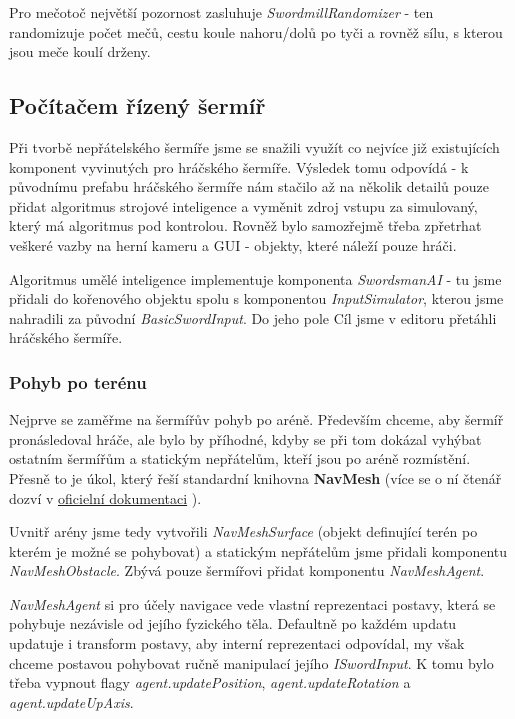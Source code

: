 Pro mečotoč největší pozornost zasluhuje \textit{SwordmillRandomizer} - ten randomizuje počet mečů, cestu koule nahoru/dolů po tyči a rovněž sílu, s kterou jsou meče koulí drženy.


\subsection{Počítačem řízený šermíř} \label{knightEnemySubsection}

Při tvorbě nepřátelského šermíře jsme se snažili využít co nejvíce již existujících komponent vyvinutých pro hráčského šermíře. Výsledek tomu odpovídá - k původnímu prefabu hráčského šermíře nám stačilo až na několik detailů pouze přidat algoritmus strojové inteligence a vyměnit zdroj vstupu za simulovaný, který má algoritmus pod kontrolou. Rovněž bylo samozřejmě třeba zpřetrhat veškeré vazby na herní kameru a GUI - objekty, které náleží pouze hráči.

Algoritmus umělé inteligence implementuje komponenta \textit{SwordsmanAI} - tu jsme přidali do kořenového objektu spolu s komponentou \textit{InputSimulator}, kterou jsme nahradili za původní \textit{BasicSwordInput}. Do jeho pole Cíl jsme v editoru přetáhli hráčského šermíře.


\subsubsection*{Pohyb po terénu}

Nejprve se zaměřme na šermířův pohyb po aréně. Především chceme, aby šermíř pronásledoval hráče, ale bylo by příhodné, kdyby se při tom dokázal vyhýbat ostatním šermířům a statickým nepřátelům, kteří jsou po aréně rozmístění. Přesně to je úkol, který řeší standardní knihovna \textbf{NavMesh} (více se o ní čtenář dozví v \href{https://docs.unity3d.com/2022.2/Documentation/Manual/Navigation.html}{oficielní dokumentaci} \cite{Unity}).

Uvnitř arény jsme tedy vytvořili \textit{NavMeshSurface} (objekt definující terén po kterém je možné se pohybovat) a statickým nepřátelům jsme přidali komponentu \textit{NavMeshObstacle}. Zbývá pouze šermířovi přidat komponentu \textit{NavMeshAgent}.

\textit{NavMeshAgent} si pro účely navigace vede vlastní reprezentaci postavy, která se pohybuje nezávisle od jejího fyzického těla. Defaultně po každém updatu updatuje i transform postavy, aby interní reprezentaci odpovídal, my však chceme postavou pohybovat ručně manipulací jejího \textit{ISwordInput}. K tomu bylo třeba vypnout flagy \textit{agent.updatePosition}, \textit{agent.updateRotation} a \textit{agent.updateUpAxis}. 

